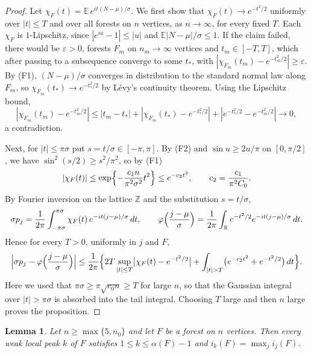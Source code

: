 \documentclass{amsart}
\numberwithin{equation}{section}
\theoremstyle{plain}
\newtheorem{lemma}[theorem]{Lemma}
\theoremstyle{definition}
\theoremstyle{remark}
\newcommand{\R}{\mathbb{R}}
\newcommand{\E}{\mathbb{E}}
\newcommand{\eps}{\varepsilon}
\begin{document}
\begin{proof}
Let $\chi_F(t)=\E\,e^{it(N-\mu)/\sigma}$. We first show that $\chi_F(t)\to e^{-t^2/2}$ uniformly over $|t|\le T$ and over all forests on $n$ vertices, as $n\to\infty$, for every fixed $T$. Each $\chi_F$ is $1$-Lipschitz, since $|e^{iu}-1|\le|u|$ and $\E|N-\mu|/\sigma\le1$. If the claim failed, there would be $\eps>0$, forests $F_m$ on $n_m\to\infty$ vertices and $t_m\in[-T,T]$, which after passing to a subsequence converge to some $t_*$, with $|\chi_{F_m}(t_m)-e^{-t_m^2/2}|\ge\eps$. By (F1), $(N-\mu)/\sigma$ converges in distribution to the standard normal law along $F_m$, so $\chi_{F_m}(t_*)\to e^{-t_*^2/2}$ by L\'evy's continuity theorem. Using the Lipschitz bound,
\[
|\chi_{F_m}(t_m)-e^{-t_m^2/2}|\le|t_m-t_*|+|\chi_{F_m}(t_*)-e^{-t_*^2/2}|+|e^{-t_*^2/2}-e^{-t_m^2/2}|\to0,
\]
a contradiction.

Next, for $|t|\le\pi\sigma$ put $s=t/\sigma\in[-\pi,\pi]$. By (F2) and $\sin u\ge2u/\pi$ on $[0,\pi/2]$, we have $\sin^2(s/2)\ge s^2/\pi^2$, so by (F1)
\[
|\chi_F(t)|\le\exp\Bigl\{-\frac{c_1n}{\pi^2\sigma^2}t^2\Bigr\}\le e^{-c_2t^2},\qquad c_2=\frac{c_1}{\pi^2C_0}.
\]
By Fourier inversion on the lattice $\mathbb Z$ and the substitution $s=t/\sigma$,
\[
\sigma p_j=\frac{1}{2\pi}\int_{-\pi\sigma}^{\pi\sigma}\chi_F(t)\,e^{-it(j-\mu)/\sigma}\,dt,\qquad
\varphi\Bigl(\frac{j-\mu}{\sigma}\Bigr)=\frac1{2\pi}\int_{\R}e^{-t^2/2}e^{-it(j-\mu)/\sigma}\,dt .
\]
Hence for every $T>0$, uniformly in $j$ and $F$,
\[
\Bigl|\sigma p_j-\varphi\Bigl(\frac{j-\mu}{\sigma}\Bigr)\Bigr|\le\frac1{2\pi}\Bigl\{2T\sup_{|t|\le T}\bigl|\chi_F(t)-e^{-t^2/2}\bigr|+\int_{|t|>T}\bigl(e^{-c_2t^2}+e^{-t^2/2}\bigr)\,dt\Bigr\}.
\]
Here we used that $\pi\sigma\ge\pi\sqrt{c_0n}\ge T$ for large $n$, so that the Gaussian integral over $|t|>\pi\sigma$ is absorbed into the tail integral. Choosing $T$ large and then $n$ large proves the proposition.
\end{proof}

\begin{lemma}\label{lem:peakmax}
Let $n\ge\max\{5,n_0\}$ and let $F$ be a forest on $n$ vertices. Then every weak local peak $k$ of $F$ satisfies $1\le k\le\alpha(F)-1$ and $i_k(F)=\max_ji_j(F)$.
\end{lemma}
\end{document}
